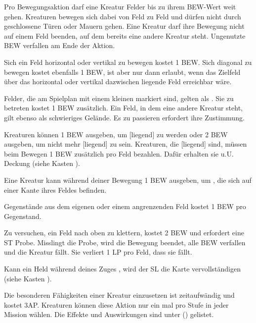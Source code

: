 {		

			Pro Bewegungsaktion darf eine Kreatur Felder bis zu ihrem BEW-Wert weit gehen. Kreaturen bewegen sich dabei von Feld zu Feld und dürfen nicht durch geschlossene Türen oder Mauern gehen. Eine Kreatur darf ihre Bewegung nicht auf einem Feld beenden, auf dem bereits eine andere Kreatur steht. Ungenutzte BEW verfallen am Ende der Aktion.

			Sich ein Feld horizontal oder vertikal zu bewegen kostet 1 BEW. Sich diagonal zu bewegen kostet ebenfalls 1 BEW, ist aber nur dann erlaubt, wenn das Zielfeld über das horizontal oder vertikal dazwischen liegende Feld erreichbar wäre.

			Felder, die am Spielplan mit einem kleinen  markiert sind, gelten als . Sie zu betreten kostet 1 BEW zusätzlich. Ein Feld, in dem eine andere Kreatur steht, gilt ebenso als schwieriges Gelände. Es zu passieren erfordert ihre Zustimmung.

			Kreaturen können 1 BEW ausgeben, um [liegend] zu werden oder 2 BEW ausgeben, um nicht mehr [liegend] zu sein. Kreaturen, die [liegend] sind, müssen beim Bewegen 1 BEW zusätzlich pro Feld bezahlen. Dafür erhalten sie u.U. Deckung (siehe Kasten ).

			Eine Kreatur kann während deiner Bewegung 1 BEW ausgeben, um , die sich auf einer Kante ihres Feldes befinden.

			Gegenstände aus dem eigenen oder einem angrenzenden Feld  kostet 1 BEW pro Gegenstand.

			Zu versuchen, ein Feld nach oben zu klettern, kostet 2 BEW und erfordert eine ST Probe. Misslingt die Probe, wird die Bewegung beendet, alle BEW verfallen und die Kreatur fällt. Sie verliert 1 LP pro Feld, dass sie fällt.

			Kann ein Held während deines Zuges , wird der SL die Karte vervollständigen (siehe Kasten ).

			Die besonderen Fähigkeiten einer Kreatur einzusetzen ist zeitaufwändig und kostet 3AP. Kreaturen können diese Aktion nur ein mal pro Stufe in jeder Mission wählen. Die Effekte und Auswirkungen sind unter  () gelistet.

}
